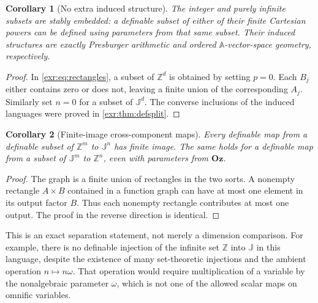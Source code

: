 \documentclass[11pt,letterpaper]{article}
\numberwithin{equation}{section}
\newtheorem{corollary}[corollary]{Corollary}
\theoremstyle{definition}
\theoremstyle{remark}
\newcommand{\Oz}{\mathbf{Oz}}
\newcommand{\Z}{\mathbb Z}
\newcommand{\A}{\mathbb A}
\newcommand{\J}{\mathbb J}
\begin{document}
\begin{corollary}[No extra induced structure]\label{exr:cor:stable}
The integer and purely infinite subsets are stably embedded: a definable subset
of either of their finite Cartesian powers can be defined using parameters from
that same subset. Their induced structures are exactly Presburger arithmetic and
ordered $\A$-vector-space geometry, respectively.
\end{corollary}
\begin{proof}
In \eqref{exr:eq:rectangles}, a subset of $\Z^d$ is obtained by setting $p=0$. Each
$B_j$ either contains zero or does not, leaving a finite union of the corresponding
$A_j$. Similarly set $n=0$ for a subset of $\J^d$. The converse inclusions of the
induced languages were proved in \cref{exr:thm:defsplit}.
\end{proof}

\begin{corollary}[Finite-image cross-component maps]\label{exr:cor:finiteimage}
Every definable map from a definable subset of $\Z^m$ to $\J^n$ has finite image.
The same holds for a definable map from a subset of $\J^m$ to $\Z^n$, even with
parameters from $\Oz$.
\end{corollary}
\begin{proof}
The graph is a finite union of rectangles in the two sorts. A nonempty rectangle
$A\times B$ contained in a function graph can have at most one element in its
output factor $B$. Thus each nonempty rectangle contributes at most one output.
The proof in the reverse direction is identical.
\end{proof}

This is an exact separation statement, not merely a dimension comparison.
For example, there is no definable injection of the infinite set $\Z$ into $\J$
in this language, despite the existence of many set-theoretic injections and the
ambient operation $n\mapsto n\omega$. That operation would require multiplication
of a variable by the nonalgebraic parameter $\omega$, which is not one of the
allowed scalar maps on omnific variables.
\end{document}
